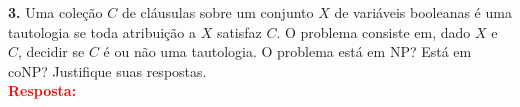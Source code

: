 
\noindent\textbf{3.} Uma coleção $C$ de cláusulas sobre um conjunto $X$ de variáveis booleanas é uma tautologia se toda atribuição a $X$ satisfaz $C$. O problema  consiste em, dado $X$ e $C$, decidir se $C$ é ou não uma tautologia. O problema  está em NP? Está em coNP? Justifique suas respostas.\\[6pt]
\textcolor{red}{\textbf{Resposta:}}